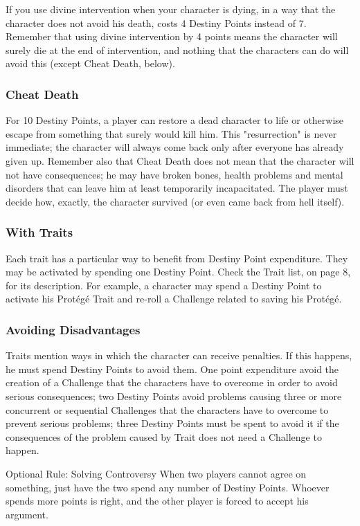 \begin{multicols}{2}
If you use divine intervention when your
character is dying, in a way that the character does
not avoid his death, costs 4 Destiny Points instead
of 7. Remember that using divine intervention by
4 points means the character will surely die at the
end of intervention, and nothing that the
characters can do will avoid this (except Cheat
Death, below).

\subsubsection{Cheat Death}
For 10 Destiny Points, a player can restore
a dead character to life or otherwise escape from
something that surely would kill him. This
"resurrection" is never immediate; the character
will always come back only after everyone has
already given up. Remember also that Cheat Death
does not mean that the character will not have
consequences; he may have broken bones, health
problems and mental disorders that can leave him
at least temporarily incapacitated. The player
must decide how, exactly, the character survived
(or even came back from hell itself).

\subsubsection{With Traits}
Each trait has a particular way to benefit
from Destiny Point expenditure. They may be
activated by spending one Destiny Point. Check the
Trait list, on page 8, for its description. For
example, a character may spend a Destiny Point to
activate his Protégé Trait and re-roll a Challenge
related to saving his Protégé.

\subsubsection{Avoiding Disadvantages}
Traits mention ways in which the
character can receive penalties. If this happens, he
must spend Destiny Points to avoid them. One
point expenditure avoid the creation of a
Challenge that the characters have to overcome in
order to avoid serious consequences; two Destiny
Points avoid problems causing three or more
concurrent or sequential Challenges that the
characters have to overcome to prevent serious
problems; three Destiny Points must be spent to
avoid it if the consequences of the problem caused
by Trait does not need a Challenge to happen.

Optional Rule: Solving Controversy
When two players cannot agree on
something, just have the two spend any number
of Destiny Points. Whoever spends more points
is right, and the other player is forced to accept
his argument.
\end{multicols}

